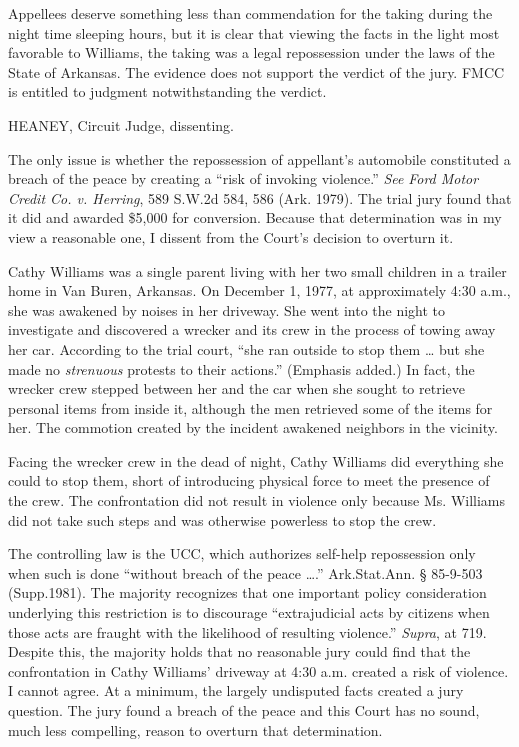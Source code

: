 Appellees deserve something less than commendation for the taking during the
night time sleeping hours, but it is clear that viewing the facts in the light
most favorable to Williams, the taking was a legal repossession under the laws
of the State of Arkansas. The evidence does not support the verdict of the
jury. FMCC is entitled to judgment notwithstanding the verdict.

HEANEY, Circuit Judge, dissenting.

The only issue is whether the repossession of appellant's automobile constituted
a breach of the peace by creating a ``risk of invoking violence.'' \textit{See}
\textit{Ford Motor Credit Co. v. Herring}, 589 S.W.2d 584, 586 (Ark. 1979). The
trial jury found that it did and awarded \$5,000 for conversion. Because that
determination was in my view a reasonable one, I dissent from the Court's
decision to overturn it.

Cathy Williams was a single parent living with her two small children in a
trailer home in Van Buren, Arkansas. On December 1, 1977, at approximately 4:30
a.m., she was awakened by noises in her driveway. She went into the night to
investigate and discovered a wrecker and its crew in the process of towing away
her car. According to the trial court, ``she ran outside to stop them \ldots
but she made no \textit{strenuous} protests to their actions.'' (Emphasis
added.) In fact, the wrecker crew stepped between her and the car when she
sought to retrieve personal items from inside it, although the men retrieved
some of the items for her. The commotion created by the incident awakened
neighbors in the vicinity.

Facing the wrecker crew in the dead of night, Cathy Williams did everything she
could to stop them, short of introducing physical force to meet the presence of
the crew. The confrontation did not result in violence only because Ms.
Williams did not take such steps and was otherwise powerless to stop the crew.

The controlling law is the UCC, which authorizes self-help repossession only
when such is done ``without breach of the peace \ldots.'' Ark.Stat.Ann. {\S}
85-9-503 (Supp.1981). The majority recognizes that one important policy
consideration underlying this restriction is to discourage ``extrajudicial acts
by citizens when those acts are fraught with the likelihood of resulting
violence.'' \textit{Supra}, at 719. Despite this, the majority holds that no
reasonable jury could find that the confrontation in Cathy Williams' driveway
at 4:30 a.m. created a risk of violence. I cannot agree. At a minimum, the
largely undisputed facts created a jury question. The jury found a breach of
the peace and this Court has no sound, much less compelling, reason to overturn
that determination.

